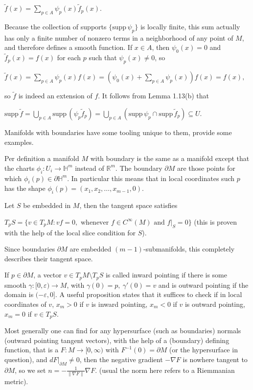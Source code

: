 \(\tilde{f}(x) = \sum_{p \in A} \psi_p(x) \tilde{f}_p(x).\)

Because the collection of supports \(\{\text{supp} \, \psi_p\}\) is locally finite, this sum actually has only a finite number of nonzero terms in a neighborhood of any point of \(M\), 
and therefore defines a smooth function. If \(x \in A\), then \(\psi_0(x) = 0\) and \(\tilde{f}_p(x) = f(x)\) for each \(p\) such that \(\psi_p(x) \neq 0\), so

\(\tilde{f}(x) = \sum_{p \in A} \psi_p(x) f(x) = \left( \psi_0(x) + \sum_{p \in A} \psi_p(x) \right) f(x) = f(x),\)

so \(\tilde{f}\) is indeed an extension of \(f\). It follows from Lemma 1.13(b) that 

\(\text{supp} \, \tilde{f} = \bigcup_{p \in A} \text{supp} \, (\psi_p \tilde{f}_p) = \bigcup_{p \in A} (\text{supp} \, \psi_p \cap \text{supp} \, \tilde{f}_p) \subseteq U.\)



Manifolds with boundaries have some tooling unique to them,
provide some examples.

Per definition a manifold \( M \) with boundary is the same as a manifold except that the charts
\( \phi_i : U_i \to \mathbb{H}^m \) instead of \( \mathbb{R}^m \). The boundary \( \partial M \)
are those points for which \( \phi_i(p) \in \partial \mathbb{H}^m \). In particular this means
that in local coordinates such \( p \) has the shape \( \phi_i(p) = (x_1, x_2, \dots, x_{m-1}, 0) \).

Let \( S \) be embedded in \( M \), then the tangent space satisfies

\( T_p S = \{v \in T_pM: vf = 0, \text{ whenever } f \in C^\infty(M) \text{ and } f|_S = 0\}\)
(this is proven with the help of the local slice condition for \( S \)).

Since boundaries \( \partial M \) are embedded \((m-1)\)-submanifolds, 
this completely describes their tangent space.

If \( p \in \partial M \), a vector \( v \in T_p M \setminus T_p S \) is called inward pointing
if there is some smooth \( \gamma : [0, \varepsilon) \to M \), with \( \gamma(0) = p,\ \gamma'(0) = v \)
and is outward pointing if the domain is \( (-\varepsilon, 0] \). 
A useful proposition states that it suffices to check if in local coordinates of \( v \), 
\( x_m > 0\) if \( v \) is inward pointing,
\( x_m < 0\) if \( v \) is outward pointing,
\( x_m = 0\) if \( v \in T_p S\).

Most generally one can find for any hypersurface (such as boundaries) normals (outward pointing tangent vectors),
with the help of a (boundary) defining function, that is a  \( F : M \to [0, \infty) \) with \( F^{-1}(0) = \partial M \) (or the hypersurface in question),
and \( dF|_{\partial M} \neq 0\), then the negative gradient \( -\nabla F \) is nowhere tangent to \( \partial M \), so we set \( n = -\frac{1}{\|\nabla F\|}\nabla F \).
(usual the norm here refers to a Riemmanian metric).

